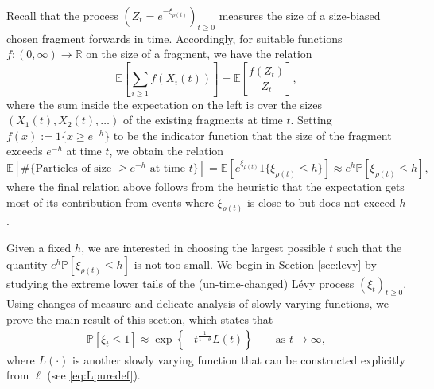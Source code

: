 \documentclass[a4,12pt]{amsart}
\numberwithin{equation}{section}
\begin{document}
    Recall that the process $(Z_t = e^{ - \xi_{\rho(t)}})_{t \geq 0}$ measures the size of a size-biased chosen fragment forwards in time. Accordingly, for suitable functions $f:(0,\infty) \to \mathbb{R}$ on the size of a fragment, we have the relation
    \begin{equation}\label{eq:2:Many2one0}
		\mathbb{E} \left[ \sum_{i \geq 1} f(X_i(t)) \right] 
		= \mathbb{E} \left[ \frac{f(Z_t)}{Z_t} \right],
	\end{equation}
    where the sum inside the expectation on the left is over the sizes $(X_1(t),X_2(t),\ldots)$ of the existing fragments at time $t$. Setting $f(x) := \mathrm{1} \{ x \geq e^{-h} \}$ to be the indicator function that the size of the fragment exceeds $e^{-h}$ at time $t$, we obtain the relation
	\begin{equation}\label{eq:2:Many2one00}
		\mathbb{E} \left[ \# \{ \text{Particles of size $\geq e^{-h}$ at time $t$} \}  \right] 
		= \mathbb{E}[ e^{ \xi_{\rho(t)} } \mathrm{1} \{ \xi_{\rho(t)} \leq h \} ] \approx  e^h \mathbb{P}[ \xi_{\rho(t)} \leq h ],
	\end{equation}
    where the final relation above follows from the heuristic that the expectation gets most of its contribution from events where $\xi_{\rho(t)}$ is close to but does not exceed $h$.

    Given a fixed $h$, we are interested in choosing the largest possible $t$ such that the quantity $e^h \mathbb{P}[ \xi_{\rho(t)} \leq h]$ is not too small. We begin in Section \ref{sec:levy} by studying the extreme lower tails of the (un-time-changed) L\'evy process $(\xi_t)_{t \geq 0}$. Using changes of measure and delicate analysis of slowly varying functions, we prove the main result of this section, which states that
    \begin{align*}
        \mathbb{P}[ \xi_t \leq 1 ] \approx  \exp \left\{ - t^{ \frac{1}{1-\theta} } L(t) \right\} \qquad \text{as $t \to \infty$},
    \end{align*}
    where $L(\cdot)$ is another slowly varying function that can be constructed explicitly from $\ell$ (see \eqref{eq:Lpuredef}). 
\end{document}
